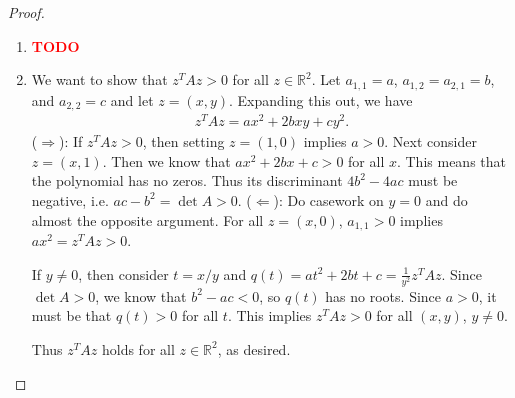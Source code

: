 \documentclass[12pt]{article}
\newcommand{\todo}{\textcolor{red}{\textbf{TODO }}}
\theoremstyle{remark}
\theoremstyle{named}
\newcommand{\R}{\mathbb R}
\begin{document}
\begin{proof}
\begin{enumerate}
        \item \todo
        \item We want to show that \(z^T A z > 0\) for all \(z \in \R^2\). Let \(a_{1, 1} = a\), \(a_{1, 2} = a_{2, 1} = b\), and \(a_{2, 2} = c\) and let \(z = (x, y)\). Expanding this out, we have
        \begin{align*}
            z^T A z = ax^2 + 2bxy + cy^2. 
        \end{align*}
        (\(\Rightarrow\)): If \(z^T A z > 0\), then setting \(z = (1, 0)\) implies \(a > 0\). Next consider \(z = (x, 1)\). Then we know that \(ax^2 + 2bx + c > 0\) for all \(x\). This means that the polynomial has no zeros. Thus its discriminant \(4b^2 - 4ac\) must be negative, i.e. \(ac - b^2 = \det A > 0\).
        (\(\Leftarrow\)): Do casework on \(y = 0\) and do almost the opposite argument. For all \(z = (x, 0)\), \(a_{1, 1} > 0\) implies \(ax^2 = z^T A z > 0\). 

        If \(y \neq 0\), then consider \(t = x/y\) and \(q(t) = at^2 + 2bt + c = \frac{1}{y^2} z^T A z\). Since \(\det A > 0\), we know that \(b^2 - ac < 0\), so \(q(t)\) has no roots. Since \(a > 0\), it must be that \(q(t) > 0\) for all \(t\). This implies \(z^T A z > 0\) for all \((x, y)\), \(y \neq 0\). 
        
        Thus \(z^T A z\) holds for all \(z \in \R^2\), as desired.
    \end{enumerate}
\end{proof}
\end{document}
